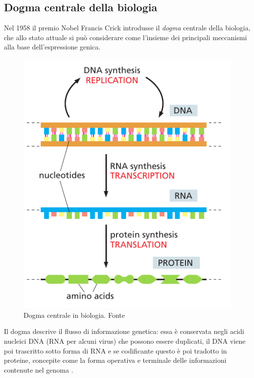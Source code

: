 \subsection{Dogma centrale della biologia}

Nel 1958 il premio Nobel Francis Crick introdusse il \textit{dogma} centrale della biologia, che allo stato attuale si può considerare come l'insieme dei principali meccanismi alla base dell'espressione genica. 

\begin{figure}[h]
	\centering
	\includegraphics[scale=0.45]{images/central-dogma.png}
	\caption{Dogma centrale in biologia. Fonte \cite{alberts2018essential}}
	\label{fig:central-dogma}
\end{figure}

Il dogma descrive il flusso di informazione genetica: essa è conservata negli acidi nucleici DNA (RNA per alcuni virus) che possono essere duplicati, il DNA viene poi trascritto sotto forma di RNA e se codificante questo è poi tradotto in proteine, concepite come la forma operativa e terminale delle informazioni contenute nel genoma \supercite{dogma-wiki}.

